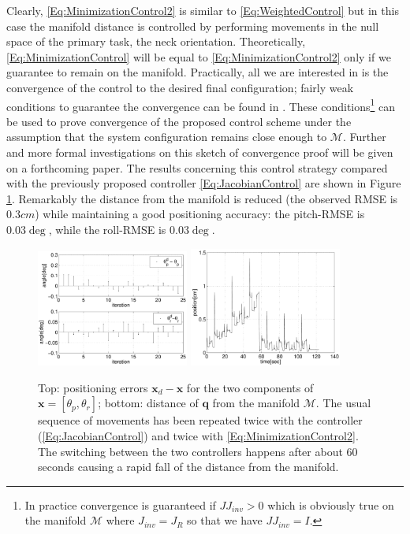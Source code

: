 \documentclass[conference]{IEEEtran}
\numberwithin{equation}{section}
\newcommand{\q}{\mathbf{q}}
\newcommand{\x}{\mathbf{x}}
\begin{document}
Clearly, \eqref{Eq:MinimizationControl2} is similar to \eqref{Eq:WeightedControl} but in this case the manifold distance is controlled by performing movements in the null space of the primary task, the neck orientation. Theoretically, \eqref{Eq:MinimizationControl} will be equal to \eqref{Eq:MinimizationControl2} only if we guarantee to remain on the manifold. Practically, all we are interested in is the convergence of the control to the desired final configuration; fairly weak conditions to guarantee the convergence can be found in \cite{SamsonEspiau}. These conditions\footnote{In practice convergence is guaranteed if $J J_{inv} >0$ which is obviously true on the manifold $\mathcal M$ where $J_{inv} = J_R$ so that we have $J J_{inv} = I$.} can be used to prove convergence of the proposed control scheme under the assumption that the system configuration remains close enough to $\mathcal M$. Further and more formal investigations on this sketch of convergence proof will be given on a forthcoming paper. The results concerning this control strategy compared with the previously proposed controller \eqref{Eq:JacobianControl} are shown in Figure \ref{Fig:ManifoldDistanceJacobianAndMinimization}. Remarkably the distance from the manifold is reduced (the observed RMSE is $0.3cm$) while maintaining a good positioning accuracy: the pitch-RMSE is $0.03 \deg$, while the roll-RMSE is $0.03 \deg$.

\begin{figure}[tbp]
\centering 
\includegraphics[width=50mm]{image/JacobianVSMinimizationErrors.pdf} 
\includegraphics[width=50mm]{image/JacobianVSMinimizationDistance.pdf} 
\caption{Top: positioning errors $\x_d - \x$ for the two components of $\x = [\theta_p, \theta_r]$; bottom: distance of $\q$ from the manifold $\mathcal M$. The usual sequence of movements has been repeated twice with the controller (\ref{Eq:JacobianControl}) and twice with \eqref{Eq:MinimizationControl2}. The switching between the two controllers happens after about 60 seconds causing a rapid fall of the distance from the manifold.} 
\label{Fig:ManifoldDistanceJacobianAndMinimization}
\end{figure}
\end{document}
